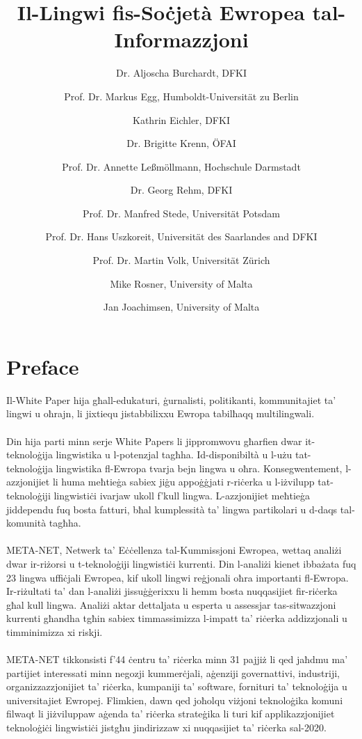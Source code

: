 \documentclass[11pt]{article}
\begin{document}
  \title{Il-Lingwi fis-Soċjetà Ewropea tal-Informazzjoni}
  
  \author{
    Dr. Aljoscha Burchardt, DFKI \and
    Prof. Dr. Markus Egg, Humboldt-Universität zu Berlin \and
    Kathrin Eichler, DFKI \and
    Dr. Brigitte Krenn, ÖFAI \and
    Prof. Dr. Annette Leßmöllmann, Hochschule Darmstadt \and
    Dr. Georg Rehm, DFKI \and
    Prof. Dr. Manfred Stede, Universität Potsdam \and
    Prof. Dr. Hans Uszkoreit, Universität des Saarlandes and DFKI \and
    Prof. Dr. Martin Volk, Universität Zürich \and
    Mike Rosner, University of Malta \and
    Jan Joachimsen, University of Malta
  }
  
  \maketitle
  
  \tableofcontents
  \clearpage
  
  \section*{Preface}
  Il-White Paper hija għall-edukaturi, ġurnalisti, politikanti, kommunitajiet ta’ lingwi u oħrajn, li jixtiequ jistabbilixxu Ewropa tabilħaqq multilingwali. \\\\
  Din hija parti minn serje White Papers li jippromwovu għarfien dwar it-teknoloġija lingwistika u l-potenzjal tagħha. Id-disponibiltà u l-użu tat-teknoloġija lingwistika fl-Ewropa tvarja bejn lingwa u oħra. Konsegwentement, l-azzjonijiet li huma meħtieġa sabiex jiġu appoġġjati r-riċerka u l-iżvilupp tat-teknoloġiji lingwistiċi ivarjaw ukoll f’kull lingwa.  L-azzjonijiet meħtieġa jiddependu fuq bosta fatturi, bħal kumplessità ta’ lingwa partikolari u d-daqs tal-komunità tagħha.\\\\
  META-NET, Netwerk ta’ Eċċellenza tal-Kummissjoni Ewropea, wettaq analiżi dwar ir-riżorsi u t-teknoloġiji lingwistiċi kurrenti. Din l-analiżi kienet ibbażata fuq 23 lingwa uffiċjali Ewropea, kif ukoll lingwi reġjonali oħra importanti fl-Ewropa. Ir-riżultati ta’ dan l-analiżi jissuġġerixxu li hemm bosta nuqqasijiet fir-riċerka għal kull lingwa. Analiżi aktar dettaljata u esperta u assessjar tas-sitwazzjoni kurrenti għandha tgħin sabiex timmassimizza l-impatt ta’ riċerka addizzjonali u timminimizza xi riskji.\\\\
  META-NET tikkonsisti f’44 ċentru ta’ riċerka minn 31 pajjiż li qed jaħdmu ma’ partijiet interessati minn negozji kummerċjali, aġenziji governattivi, industriji, organizzazzjonijiet ta’ riċerka, kumpaniji ta’ software, fornituri ta’ teknoloġija u universitajiet Ewropej. Flimkien, dawn qed joħolqu viżjoni teknoloġika komuni filwaqt li jiżviluppaw aġenda ta’ riċerka strateġika li turi kif applikazzjonijiet teknoloġiċi lingwistiċi jistgħu jindirizzaw xi nuqqasijiet ta’ riċerka sal-2020. 
  
\end{document}
